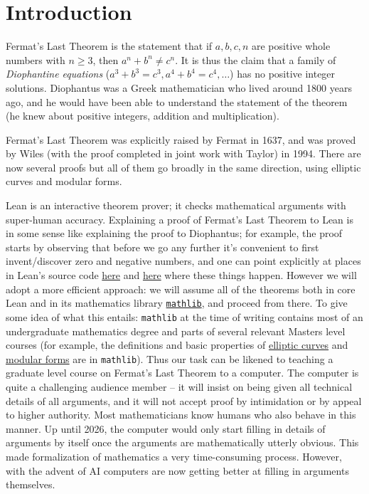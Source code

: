 \chapter{Introduction}

Fermat's Last Theorem is the statement that if $a,b,c,n$ are positive whole numbers with $n\geq 3$,
then $a^n+b^n\not=c^n$. It is thus the claim that a family of \emph{Diophantine equations}
($a^3+b^3=c^3, a^4+b^4=c^4,\ldots$) has no positive integer solutions.
Diophantus was a Greek mathematician who lived around 1800
years ago, and he would have been able to understand the statement of the theorem (he knew about
positive integers, addition and multiplication).

Fermat's Last Theorem was explicitly raised by Fermat in 1637, and was proved by Wiles (with the
proof completed in joint work with Taylor) in 1994. There are now several proofs but all of them
go broadly in the same direction, using elliptic curves and modular forms.

Lean is an interactive theorem prover; it checks mathematical arguments with super-human accuracy.
Explaining a proof of Fermat's Last Theorem to Lean is in some sense like explaining the proof to
Diophantus; for example, the proof starts by observing that before we go any further it's convenient
to first invent/discover zero and negative numbers, and one can point explicitly at places in Lean's
source code \href{https://github.com/leanprover/lean4/blob/260eaebf4e804c9ac1319532970544a4e157c336/src/Init/Prelude.lean#L1049}{here}
and \href{https://github.com/leanprover/lean4/blob/260eaebf4e804c9ac1319532970544a4e157c336/src/Init/Data/Int/Basic.lean#L45}{here}
where these things happen. However we will adopt a more efficient approach: we will assume all of
the theorems both in core Lean and in its mathematics library
\href{https://github.com/leanprover-community/mathlib4}{\tt mathlib}, and proceed from there.
To give some idea of what this entails: {\tt mathlib} at the time of writing contains most of an
undergraduate mathematics degree and parts of several relevant Masters level courses (for example,
the definitions and basic properties of
\href{https://leanprover-community.github.io/mathlib4_docs/Mathlib/AlgebraicGeometry/EllipticCurve/Weierstrass.html}{elliptic curves}
and \href{https://leanprover-community.github.io/mathlib4_docs/Mathlib/NumberTheory/ModularForms/Basic.html}{modular forms}
are in {\tt mathlib}). Thus our task can be likened to teaching a graduate level course on
Fermat's Last Theorem to a computer. The computer is quite a challenging audience member -- it
will insist on being given all technical details of all arguments, and it will not accept proof by
intimidation or by appeal to higher authority. Most mathematicians know humans who also behave
in this manner. Up until 2026, the computer would only start filling
in details of arguments by itself once the arguments are mathematically utterly obvious.
This made formalization of mathematics a very time-consuming process. However, with the
advent of AI computers are now getting better at filling in arguments themselves.

